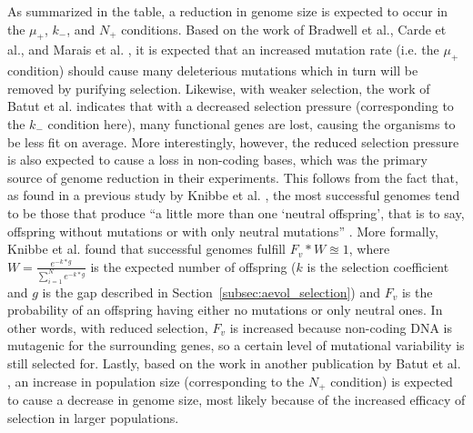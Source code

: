 As summarized in the table, a reduction in genome size is expected to occur in the $\mu_+$, $k_-$, and $N_+$ conditions. Based on the work of Bradwell et al., Carde et al., and Marais et al. \cite{bradwell2013correlation, carde.2019, marais2008mutation}, it is expected that an increased mutation rate (i.e. the $\mu_+$ condition) should cause many deleterious mutations which in turn will be removed by purifying selection. Likewise, with weaker selection, the work of Batut et al. \cite{Batut.2013} indicates that with a decreased selection pressure (corresponding to the $k_-$ condition here), many functional genes are lost, causing the organisms to be less fit on average. More interestingly, however, the reduced selection pressure is also expected to cause a loss in non-coding bases, which was the primary source of genome reduction in their experiments. This follows from the fact that, as found in a previous study by Knibbe et al. \cite{Knibbe2007}, the most successful genomes tend to be those that produce ``a little more than one `neutral offspring', that is to say, offspring without mutations or with only neutral mutations'' \cite{Batut.2013}. More formally, Knibbe et al. found that successful genomes fulfill $F_v*W \approxeq 1$, where $W=\frac{e^{-k*g}}{\sum_{i=1}^{N}e^{-k*g}}$ is the expected number of offspring ($k$ is the selection coefficient and $g$ is the gap described in Section~\ref{subsec:aevol_selection}) and $F_v$ is the probability of an offspring having either no mutations or only neutral ones. In other words, with reduced selection, $F_v$ is increased because non-coding DNA is mutagenic for the surrounding genes, so a certain level of mutational variability is still selected for. Lastly, based on the work in another publication by Batut et al. \cite{Batut.2014}, an increase in population size (corresponding to the $N_+$ condition) is expected to cause a decrease in genome size, most likely because of the increased efficacy of selection in larger populations. 




